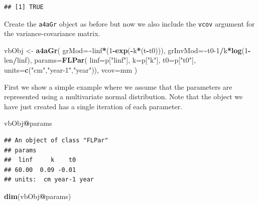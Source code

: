 \documentclass[
]{book}
\newenvironment{Shaded}{\begin{snugshade}}{\end{snugshade}}
\newcommand{\AttributeTok}[1]{\textcolor[rgb]{0.13,0.29,0.53}{#1}}
\newcommand{\DecValTok}[1]{\textcolor[rgb]{0.00,0.00,0.81}{#1}}
\newcommand{\FunctionTok}[1]{\textcolor[rgb]{0.13,0.29,0.53}{\textbf{#1}}}
\newcommand{\NormalTok}[1]{#1}
\newcommand{\OtherTok}[1]{\textcolor[rgb]{0.56,0.35,0.01}{#1}}
\newcommand{\SpecialCharTok}[1]{\textcolor[rgb]{0.81,0.36,0.00}{\textbf{#1}}}
\newcommand{\StringTok}[1]{\textcolor[rgb]{0.31,0.60,0.02}{#1}}
\begin{document}
\begin{verbatim}
## [1] TRUE
\end{verbatim}

Create the \texttt{a4aGr} object as before but now we also include the \texttt{vcov} argument for the variance-covariance matrix.

\begin{Shaded}
\begin{Highlighting}[]
\NormalTok{vbObj }\OtherTok{\textless{}{-}} \FunctionTok{a4aGr}\NormalTok{(}
  \AttributeTok{grMod=}\SpecialCharTok{\textasciitilde{}}\NormalTok{linf}\SpecialCharTok{*}\NormalTok{(}\DecValTok{1}\SpecialCharTok{{-}}\FunctionTok{exp}\NormalTok{(}\SpecialCharTok{{-}}\NormalTok{k}\SpecialCharTok{*}\NormalTok{(t}\SpecialCharTok{{-}}\NormalTok{t0))),}
  \AttributeTok{grInvMod=}\SpecialCharTok{\textasciitilde{}}\NormalTok{t0}\DecValTok{{-}1}\SpecialCharTok{/}\NormalTok{k}\SpecialCharTok{*}\FunctionTok{log}\NormalTok{(}\DecValTok{1}\SpecialCharTok{{-}}\NormalTok{len}\SpecialCharTok{/}\NormalTok{linf),}
  \AttributeTok{params=}\FunctionTok{FLPar}\NormalTok{(}
    \AttributeTok{linf=}\NormalTok{p[}\StringTok{"linf"}\NormalTok{], }\AttributeTok{k=}\NormalTok{p[}\StringTok{"k"}\NormalTok{], }\AttributeTok{t0=}\NormalTok{p[}\StringTok{"t0"}\NormalTok{],}
    \AttributeTok{units=}\FunctionTok{c}\NormalTok{(}\StringTok{"cm"}\NormalTok{,}\StringTok{"year{-}1"}\NormalTok{,}\StringTok{"year"}\NormalTok{)),}
    \AttributeTok{vcov=}\NormalTok{mm}
\NormalTok{)}
\end{Highlighting}
\end{Shaded}

First we show a simple example where we assume that the parameters are represented using a multivariate normal distribution. Note that the object we have just created has a single iteration of each parameter.

\begin{Shaded}
\begin{Highlighting}[]
\NormalTok{vbObj}\SpecialCharTok{@}\NormalTok{params}
\end{Highlighting}
\end{Shaded}

\begin{verbatim}
## An object of class "FLPar"
## params
##  linf     k    t0 
## 60.00  0.09 -0.01 
## units:  cm year-1 year
\end{verbatim}

\begin{Shaded}
\begin{Highlighting}[]
\FunctionTok{dim}\NormalTok{(vbObj}\SpecialCharTok{@}\NormalTok{params)}
\end{Highlighting}
\end{Shaded}
\end{document}
